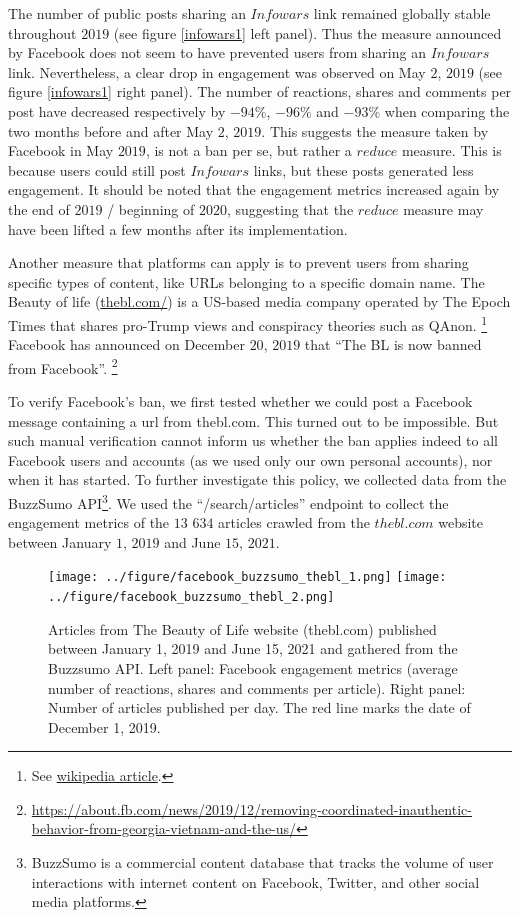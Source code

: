 \documentclass{article}
\begin{document}
The number of public posts sharing an $Infowars$ link remained globally stable throughout $2019$ (see figure \ref{infowars1} left panel). 
Thus the measure announced by Facebook does not seem to have prevented users from sharing an $Infowars$ link. Nevertheless, a clear drop in engagement was observed on May $2$, $2019$ (see figure \ref{infowars1} right panel). 
The number of reactions, shares and comments per post have decreased respectively  by $-94\%$,  $-96\%$ and $-93\%$  when comparing the two months before and after May $2$, $2019$. This suggests the measure taken by Facebook in May $2019$, is not a ban per se, but rather a $reduce$ measure. This is because users could still post $Infowars$ links, but these posts generated less engagement. It should be noted that the engagement metrics increased again by the end of $2019$ / beginning of $2020$, suggesting that the $reduce$ measure may have been lifted a few months after its implementation.

Another measure that platforms can apply is to prevent users from sharing specific types of content, like URLs belonging to a specific domain name.  
The Beauty of life (\href{https://thebl.com/}{thebl.com/}) is a US-based media company operated by The Epoch Times that shares pro-Trump views and conspiracy theories such as QAnon.
\footnote{ See \href{https://en.wikipedia.org/wiki/The\_Epoch\_Times\#Removal\_of\_The\_BL\_(The\_Beauty\_of\_Life)\_from\_Facebook}{wikipedia article}.} 
Facebook has announced on December $20$, $2019$ that ``The BL is now banned from Facebook''.
\footnote{\url{https://about.fb.com/news/2019/12/removing-coordinated-inauthentic-behavior-from-georgia-vietnam-and-the-us/}}

To verify Facebook’s ban, we first tested whether we could post a Facebook message containing a url from thebl.com. This turned out to be impossible. But such manual verification cannot inform us whether the ban applies indeed to all Facebook users and accounts (as we used only our own personal accounts), nor when it has started. To further investigate this policy, we collected data from the BuzzSumo API\footnote{BuzzSumo is a commercial content database that tracks the volume of user interactions with internet content on Facebook, Twitter, and other social media platforms.}. We used the ``/search/articles'' endpoint to collect the engagement metrics of the $13$ $634$ articles crawled from the $thebl.com$ website between January $1$, $2019$ and June $15$, $2021$.

\begin{figure}[h]
\hspace{-2em}
		\texttt{[image: ../figure/facebook\_buzzsumo\_thebl\_1.png]}
		\texttt{[image: ../figure/facebook\_buzzsumo\_thebl\_2.png]} 
	\caption{Articles from The Beauty of Life website (thebl.com) published between January 1, 2019 and June 15, 2021 and gathered from the Buzzsumo API. Left panel: Facebook engagement metrics (average number of reactions, shares and comments per article). Right panel: Number of articles published per day. The red line marks the date of December 1, 2019. }
	\label{fb_bl}
\end{figure}
\end{document}
